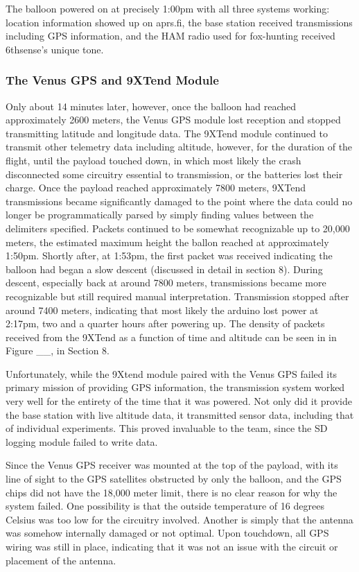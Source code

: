 \documentclass[12pt,]{article}
\begin{document}
The balloon powered on at precisely 1:00pm with all three systems
working: location information showed up on aprs.fi, the base station
received transmissions including GPS information, and the HAM radio used
for fox-hunting received 6thsense's unique tone.

\subsubsection{The Venus GPS and 9XTend
Module}\label{the-venus-gps-and-9xtend-module}

Only about 14 minutes later, however, once the balloon had reached
approximately 2600 meters, the Venus GPS module lost reception and
stopped transmitting latitude and longitude data. The 9XTend module
continued to transmit other telemetry data including altitude, however,
for the duration of the flight, until the payload touched down, in which
most likely the crash disconnected some circuitry essential to
transmission, or the batteries lost their charge. Once the payload
reached approximately 7800 meters, 9XTend transmissions became
significantly damaged to the point where the data could no longer be
programmatically parsed by simply finding values between the delimiters
specified. Packets continued to be somewhat recognizable up to 20,000
meters, the estimated maximum height the ballon reached at approximately
1:50pm. Shortly after, at 1:53pm, the first packet was received
indicating the balloon had began a slow descent (discussed in detail in
section 8). During descent, especially back at around 7800 meters,
transmissions became more recognizable but still required manual
interpretation. Transmission stopped after around 7400 meters,
indicating that most likely the arduino lost power at 2:17pm, two and a
quarter hours after powering up. The density of packets received from
the 9XTend as a function of time and altitude can be seen in in Figure
\_\_, in Section 8.

Unfortunately, while the 9Xtend module paired with the Venus GPS failed
its primary mission of providing GPS information, the transmission
system worked very well for the entirety of the time that it was
powered. Not only did it provide the base station with live altitude
data, it transmitted sensor data, including that of individual
experiments. This proved invaluable to the team, since the SD logging
module failed to write data.

Since the Venus GPS receiver was mounted at the top of the payload, with
its line of sight to the GPS satellites obstructed by only the balloon,
and the GPS chips did not have the 18,000 meter limit, there is no clear
reason for why the system failed. One possibility is that the outside
temperature of 16 degrees Celsius was too low for the circuitry
involved. Another is simply that the antenna was somehow internally
damaged or not optimal. Upon touchdown, all GPS wiring was still in
place, indicating that it was not an issue with the circuit or placement
of the antenna.
\end{document}
